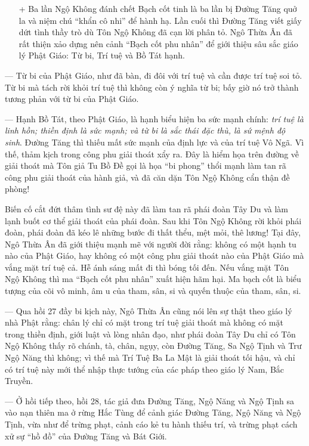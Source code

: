 \begin{enumerate}[label=\itshape\arabic*\upshape/]
   \item[+] Ba lần Ngộ Không đánh chết Bạch cốt tinh là ba lần bị Đường Tăng quở la và niệm chú ``khẩn cô nhi'' để hành hạ. Lần cuối thì Đường Tăng viết giấy dứt tình thầy trò dù Tôn Ngộ Không đã cạn lời phân tỏ. Ngô Thừa Ân đã rất thiện xảo dựng nên cảnh ``Bạch cốt phu nhân'' để giới thiệu sâu sắc giáo lý Phật Giáo: Từ bi, Trí tuệ và Bồ Tát hạnh.
\end{enumerate}

— Từ bi của Phật Giáo, như đã bàn, đi đôi với trí tuệ và cần được trí tuệ soi tỏ. Từ bi mà tách rời khỏi trí tuệ thì không còn ý nghĩa từ bi; bấy giờ nó trở thành tương phản với từ bi của Phật Giáo.

— Hạnh Bồ Tát, theo Phật Giáo, là hạnh biểu hiện ba sức mạnh chính: \emph{trí tuệ là linh hồn; thiền định là sức mạnh; và từ bi là sắc thái đặc thù, là sứ mệnh độ sinh}. Đường Tăng thì thiếu mất sức mạnh của định lực và của trí tuệ Vô Ngã. Vì thế, thảm kịch trong công phu giải thoát xẩy ra. Đây là hiểm họa trên đường về giải thoát mà Tôn giả Tu Bồ Đề gọi là họa ``bi phong'' thổi mạnh làm tan rã công phu giải thoát của hành giả, và đã căn dặn Tôn Ngộ Không cẩn thận đề phòng!

Biến cố cắt đứt thâm tình sư đệ này đã làm tan rã phái đoàn Tây Du và làm lạnh buốt cơ thể giải thoát của phái đoàn. Sau khi Tôn Ngộ Không rời khỏi phái đoàn, phái đoàn đã kéo lê những bước đi thất thểu, mệt mỏi, thê lương! Tại đây, Ngô Thừa Ân đã giới thiệu mạnh mẽ với người đời rằng: không có một hạnh tu nào của Phật Giáo, hay không có một công phu giải thoát nào của Phật Giáo mà vắng mặt trí tuệ cả. Hễ ánh sáng mất đi thì bóng tối đến. Nếu vắng mặt Tôn Ngộ Không thì ma ``Bạch cốt phu nhân'' xuất hiện hãm hại. Ma bạch cốt là biểu tượng của cõi vô minh, âm u của tham, sân, si và quyến thuộc của tham, sân, si.

— Qua hồi 27 đầy bi kịch này, Ngô Thừa Ân cũng nói lên sự thật theo giáo lý nhà Phật rằng: chân lý chỉ có mặt trong trí tuệ giải thoát mà không có mặt trong thiền định, giới luật và lòng nhân đạo, như phái đoàn Tây Du chỉ có Tôn Ngộ Không thấy rõ chánh, tà, chân, ngụy, còn Đường Tăng, Sa Ngộ Tịnh và Trư Ngộ Năng thì không; vì thế mà Trí Tuệ Ba La Mật là giải thoát tối hậu, và chỉ có trí tuệ này mới thể nhập thực tướng của các pháp theo giáo lý Nam, Bắc Truyền.

— Ở hồi tiếp theo, hồi 28, tác giả đưa Đường Tăng, Ngộ Năng và Ngộ Tịnh sa vào nạn thiên ma ở rừng Hắc Tùng để cảnh giác Đường Tăng, Ngộ Năng và Ngộ Tịnh, vừa như để trừng phạt, cảnh cáo kẻ tu hành thiếu trí, và trừng phạt cách xử sự ``hồ đồ'' của Đường Tăng và Bát Giới.

